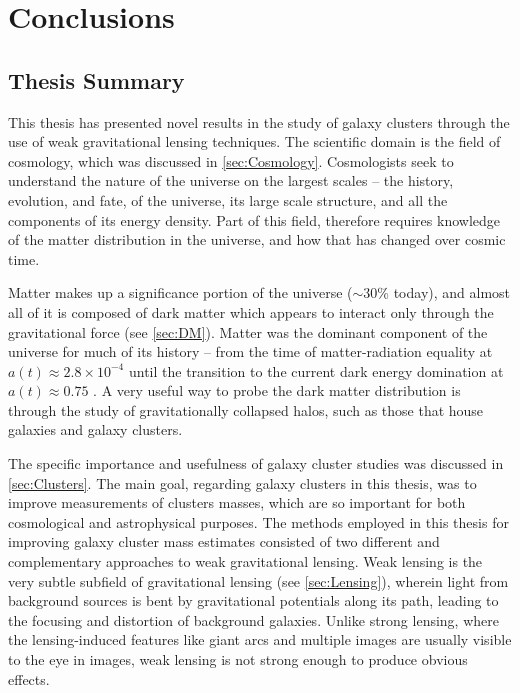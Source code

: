 
\chapter{Conclusions}
\label{ch:conc}


\section{Thesis Summary}
\label{sec:summary}

This thesis has presented novel results in the study of galaxy clusters through the use of weak gravitational lensing techniques. The scientific domain is the field of cosmology, which was discussed in \autoref{sec:Cosmology}. Cosmologists seek to understand the nature of the universe on the largest scales -- the history, evolution, and fate, of the universe, its large scale structure, and all the components of its energy density. Part of this field, therefore requires knowledge of the matter distribution in the universe, and how that has changed over cosmic time. 

Matter makes up a significance portion of the universe ($\sim30$\% today), and almost all of it is composed of dark matter which appears to interact only through the gravitational force (see \autoref{sec:DM}). Matter was the dominant component of the universe for much of its history -- from the time of matter-radiation equality at $a(t) \approx 2.8 \times 10^{-4}$ until the transition to the current dark energy domination at $a(t) \approx 0.75$ \citep{RydenText}. A very useful way to probe the dark matter distribution is through the study of gravitationally collapsed halos, such as those that house galaxies and galaxy clusters.

The specific importance and usefulness of galaxy cluster studies was discussed in \autoref{sec:Clusters}. The main goal, regarding galaxy clusters in this thesis, was to improve measurements of clusters masses, which are so important for both cosmological and astrophysical purposes. The methods employed in this thesis for improving galaxy cluster mass estimates consisted of two different and complementary approaches to weak gravitational lensing. Weak lensing is the very subtle subfield of gravitational lensing (see \autoref{sec:Lensing}), wherein light from background sources is bent by gravitational potentials along its path, leading to the focusing and distortion of background galaxies. Unlike strong lensing, where the lensing-induced features like giant arcs and multiple images are usually visible to the eye in images, weak lensing is not strong enough to produce obvious effects.


